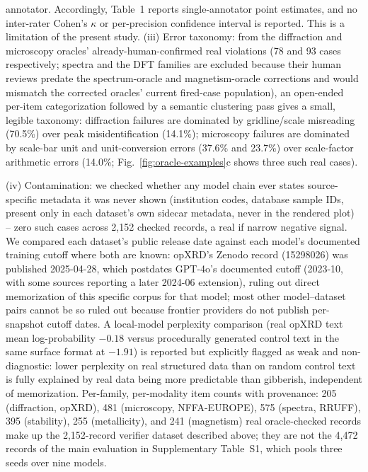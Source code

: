 \documentclass[pdflatex,sn-nature]{sn-jnl}
\begin{document}
annotator. Accordingly, Table~1 reports single-annotator point estimates, and no
inter-rater Cohen's $\kappa$ or per-precision confidence interval is reported.
This is a limitation of the present study. (iii) Error taxonomy: from the diffraction and microscopy oracles'
already-human-confirmed real violations (78 and 93 cases respectively; spectra and the DFT
families are excluded because their human reviews predate the spectrum-oracle and
magnetism-oracle corrections and would mismatch the corrected oracles' current fired-case
population), an open-ended per-item categorization followed by a semantic clustering pass
gives a small, legible taxonomy: diffraction failures are dominated by gridline/scale
misreading (70.5\%) over peak misidentification (14.1\%); microscopy failures are
dominated by scale-bar unit and unit-conversion errors (37.6\% and 23.7\%) over scale-factor
arithmetic errors (14.0\%; Fig.~\ref{fig:oracle-examples}c shows three such real cases).

(iv) Contamination: we checked whether any model chain ever
states source-specific metadata it was never shown (institution codes, database sample
IDs, present only in each dataset's own sidecar metadata, never in the rendered plot) --
zero such cases across 2{,}152 checked records, a real if narrow negative signal. We
compared each dataset's public release date against each model's documented training
cutoff where both are known: opXRD's Zenodo record (15298026) was published 2025-04-28,
which postdates GPT-4o's documented cutoff (2023-10, with some sources reporting a later
2024-06 extension), ruling out direct memorization of this specific corpus for that model;
most other model--dataset pairs cannot be so ruled out because frontier providers do not
publish per-snapshot cutoff dates. A local-model perplexity comparison (real opXRD text
mean log-probability $-0.18$ versus procedurally generated control text in the same surface
format at $-1.91$) is reported but explicitly flagged as weak and non-diagnostic: lower
perplexity on real structured data than on random control text is fully explained by real
data being more predictable than gibberish, independent of memorization. Per-family,
per-modality item counts with provenance: 205 (diffraction, opXRD), 481 (microscopy,
NFFA-EUROPE), 575 (spectra, RRUFF), 395 (stability), 255 (metallicity), and 241 (magnetism)
real oracle-checked records make up the 2{,}152-record verifier dataset described above;
they are not the 4{,}472 records of the main evaluation in Supplementary Table~S1, which
pools three seeds over nine models.
\end{document}
